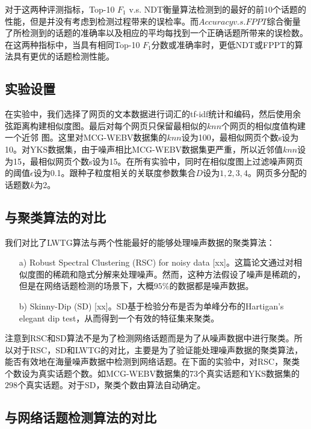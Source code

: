 对于这两种评测指标，Top-10 $F_1$ v.s. NDT衡量算法检测到的最好的前10个话题的性能，但是并没有考虑到检测过程带来的误检率。而$Accuracy v.s. FPPT$综合衡量了所检测到的话题的准确率以及相应的平均每找到一个正确话题所带来的误检数。在这两种指标中，当具有相同Top-10 $F_1$分数或准确率时，更低NDT或FPPT的算法具有更优的话题检测性能。

\subsection{实验设置}

在实验中，我们选择了网页的文本数据进行词汇的tf-idf统计和编码，然后使用余弦距离构建相似度图。最后对每个网页只保留最相似的$knn$个网页的相似度值构建一个近邻
图。这里对MCG-WEBV数据集的$knn$设为100，最相似网页个数s设为10。对YKS数据集，由于噪声相比MCG-WEBV数据集更严重，所以近邻值$knn$设为15，最相似网页个数s设为15。在所有实验中，同时在相似度图上过滤噪声网页的阈值$\epsilon$设为0.1。跟种子粒度相关的关联度参数集合$D$设为${1,2,3,4}$。网页多分配的话题数$k$为2。

\subsection{与聚类算法的对比}

我们对比了LWTG算法与两个性能最好的能够处理噪声数据的聚类算法：
\begin{enumerate}
  \item[a)] Robust Spectral Clustering (RSC) for noisy data [xx]。这篇论文通过对相似度图的稀疏和隐式分解来处理噪声。然而，这种方法假设了噪声是稀疏的，但是在网络话题检测的场景下，大概$95\%$的数据都是噪声数据。
  \item[b)] Skinny-Dip (SD) [xx]。SD基于检验分布是否为单峰分布的Hartigan’s elegant dip test，从而得到一个有效的特征集来聚类。
\end{enumerate}

注意到RSC和SD算法不是为了检测网络话题而是为了从噪声数据中进行聚类。所以对于RSC，SD和LWTG的对比，主要是为了验证能处理噪声数据的聚类算法，能否有效地在海量噪声数据中检测到网络话题。在下面的实验中，对RSC，聚类个数设为真实话题个数。如MCG-WEBV数据集的$73$个真实话题和YKS数据集的$298$个真实话题。对于SD，聚类个数由算法自动确定。




\subsection{与网络话题检测算法的对比}

